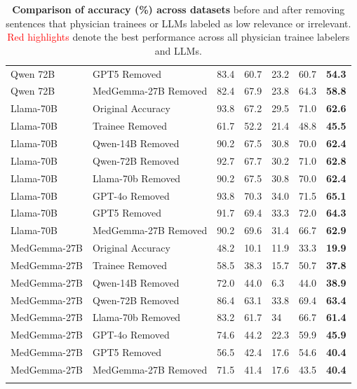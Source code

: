 \documentclass[11pt]{article}
\begin{document}
\begin{longtable}{lllllll}
Qwen 72B & GPT5 Removed & 83.4 & 60.7 & 23.2 & 60.7 & \textbf{54.3} \\
Qwen 72B & MedGemma-27B Removed & 82.4 & 67.9 & 23.8 & 64.3 & \textbf{58.8} \\
\midrule
Llama-70B & Original Accuracy & 93.8 & 67.2 & 29.5 & 71.0 & \textbf{62.6} \\
Llama-70B & Trainee Removed & 61.7 & 52.2 & 21.4 & 48.8 & \textbf{45.5} \\
Llama-70B & Qwen-14B Removed & 90.2 & 67.5 & 30.8 & 70.0 & \textbf{62.4} \\
Llama-70B & Qwen-72B Removed & 92.7 & 67.7 & 30.2 & 71.0 & \textbf{62.8} \\
Llama-70B & Llama-70b Removed & 90.2 & 67.5 & 30.8 & 70.0 & \textbf{62.4} \\
Llama-70B & {\color[HTML]{FF0000} GPT-4o Removed}  & {\color[HTML]{FF0000} 93.8} & {\color[HTML]{FF0000} 70.3} & {\color[HTML]{FF0000} 34.0} & {\color[HTML]{FF0000} 71.5} & {\color[HTML]{FF0000} \textbf{65.1}} \\
Llama-70B & GPT5 Removed & 91.7 & 69.4 & 33.3 & 72.0 & \textbf{64.3} \\
Llama-70B & MedGemma-27B Removed & 90.2 & 69.6 & 31.4 & 66.7 & \textbf{62.9} \\
\midrule
MedGemma-27B & Original Accuracy & 48.2 & 10.1 & 11.9 & 33.3 & \textbf{19.9} \\
MedGemma-27B & Trainee Removed & 58.5 & 38.3 & 15.7 & 50.7 & \textbf{37.8} \\
MedGemma-27B & Qwen-14B Removed & 72.0 & 44.0 & 6.3 & 44.0 & \textbf{38.9} \\
MedGemma-27B & {\color[HTML]{FF0000} Qwen-72B Removed} & {\color[HTML]{FF0000} 86.4} & {\color[HTML]{FF0000} 63.1} & {\color[HTML]{FF0000} 33.8} & {\color[HTML]{FF0000} 69.4} & {\color[HTML]{FF0000} \textbf{63.4}} \\
MedGemma-27B & Llama-70b Removed & 83.2 & 61.7 & 34 & 66.7 & \textbf{61.4} \\
MedGemma-27B & GPT-4o Removed & 74.6 & 44.2 & 22.3 & 59.9 & \textbf{45.9} \\
MedGemma-27B & GPT5 Removed & 56.5 & 42.4 & 17.6 & 54.6 & \textbf{40.4} \\
MedGemma-27B & MedGemma-27B Removed & 71.5 & 41.4 & 17.6 & 43.5 & \textbf{40.4} \\
\bottomrule
\caption{\textbf{Comparison of accuracy (\%) across datasets} before and after removing sentences that physician trainees or LLMs labeled as low relevance or irrelevant. \textcolor{red}{Red highlights} denote the best performance across all physician trainee labelers and LLMs.}
\label{tab:comparison}
\end{longtable}
\end{document}
